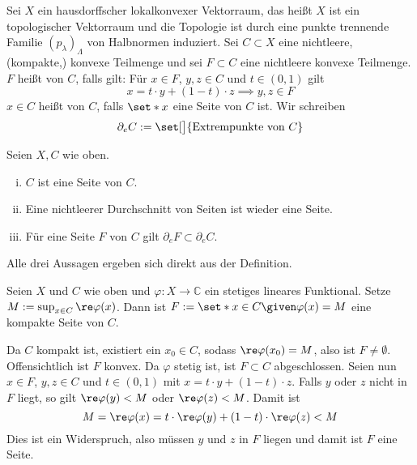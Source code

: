 \begin{definition}[{name=[Seiten und Extrempunkte]}]
	Sei $X$ ein hausdorffscher lokalkonvexer Vektorraum, das heißt $X$ ist ein topologischer Vektorraum und die Topologie ist durch eine punkte trennende Familie $(p_\lambda)_\Lambda$ von Halbnormen induziert.
	Sei $C \subset X$ eine nichtleere, (kompakte,) konvexe Teilmenge und sei $F \subset C$ eine nichtleere konvexe Teilmenge.
	$F$ heißt  von $C$, falls gilt:  
	Für $x \in F$, $y,z \in C$ und $t \in (0,1)$ gilt 
	\[
		x= t \cdot y +(1-t) \cdot z \implies y,z \in F
	\]
	$x \in C$ heißt  von $C$, falls $\set*{x}$ eine Seite von $C$ ist.
	Wir schreiben 
	\[
		\partial_e C := \set[\big]{\text{Extrempunkte von } C}
	\]
\end{definition}

\begin{proposition}[{name=[grundlegende Eigenschaften von Seiten]},label=prop:78]
	Seien $X,C$ wie oben.
	\begin{enumerate}[(i),itemsep=0pt]
		\item $C$ ist eine Seite von $C$.
		\item Eine nichtleerer Durchschnitt von Seiten ist wieder eine Seite.
		\item Für eine Seite $F$ von $C$ gilt $\partial_e F \subset \partial_e C$.
	\end{enumerate}
\end{proposition}
\begin{beweis}
	Alle drei Aussagen ergeben sich direkt aus der Definition.
\end{beweis}

\begin{lemma}[label=lem:79,{name=[durch Funktional definierte Seite]}]
	Seien $X$ und $C$ wie oben und $\varphi \colon X \to \mathbb{C}$ ein stetiges lineares Funktional.
	Setze $M :=\sup_{x \in C} \re \varphi(x)$.
	Dann ist $F:= \set*{x \in C \given \varphi(x)=M}$ eine kompakte Seite von $C$.
\end{lemma}
\begin{beweis}
	Da $C$ kompakt ist, existiert ein $x_0 \in C$, sodass $\re \varphi(x_0)=M$, also ist $F \neq \emptyset$.
	Offensichtlich ist $F$ konvex.
	Da $\varphi$ stetig ist, ist $F \subset C$ abgeschlossen.
	Seien nun $x \in F$, $y,z \in C$ und $t \in (0,1)$ mit $x= t \cdot y +(1-t) \cdot z$.
	Falls $y$ oder $z$ nicht in $F$ liegt, so gilt $\re \varphi(y) <M$ oder $\re \varphi(z)<M$.
	Damit ist 
	\[
		M = \re \varphi(x) = t \cdot \re \varphi(y) + (1-t) \cdot \re \varphi(z) <M
	\]
	Dies ist ein Widerspruch, also müssen $y$ und $z$ in $F$ liegen und damit ist $F$ eine Seite.
\end{beweis}

